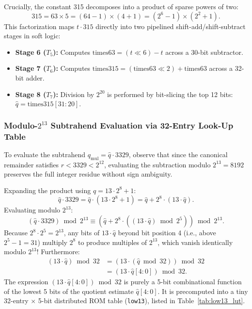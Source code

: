 Crucially, the constant 315 decomposes into a product of sparse powers of two:
\begin{equation}
\label{eq:factor_315_math}
315 = 63 \times 5 = (64 - 1) \times (4 + 1) = \left(2^6 - 1\right) \times \left(2^2 + 1\right).
\end{equation}
This factorization maps $t \cdot 315$ directly into two pipelined shift-add/shift-subtract stages in soft logic:
\begin{itemize}
    \item \textbf{Stage 6 ($T_5$):} Computes $\text{times63} = (t \ll 6) - t$ across a 30-bit subtractor.
    \item \textbf{Stage 7 ($T_6$):} Computes $\text{times315} = (\text{times63} \ll 2) + \text{times63}$ across a 32-bit adder.
    \item \textbf{Stage 8 ($T_7$):} Division by $2^{20}$ is performed by bit-slicing the top 12 bits: $\hat{q} = \text{times315}[31:20]$.
\end{itemize}

\subsubsection{Modulo-\texorpdfstring{$2^{13}$}{2\textasciicircum 13} Subtrahend Evaluation via 32-Entry Look-Up Table}
To evaluate the subtrahend $q_{\text{mul}} = \hat{q} \cdot 3329$, observe that since the canonical remainder satisfies $r < 3329 < 2^{12}$, evaluating the subtraction modulo $2^{13} = 8192$ preserves the full integer residue without sign ambiguity.

Expanding the product using $q = 13 \cdot 2^8 + 1$:
\begin{equation}
\label{eq:qmul_expansion}
\hat{q} \cdot 3329 = \hat{q} \cdot \left(13 \cdot 2^8 + 1\right) = \hat{q} + 2^8 \cdot \left(13 \cdot \hat{q}\right).
\end{equation}
Evaluating modulo $2^{13}$:
\begin{equation}
\label{eq:qmul_mod_213}
\left(\hat{q} \cdot 3329\right) \bmod 2^{13} \equiv \left(\hat{q} + 2^8 \cdot \left((13 \cdot \hat{q}) \bmod 2^5\right)\right) \bmod 2^{13}.
\end{equation}
Because $2^8 \cdot 2^5 = 2^{13}$, any bits of $13 \cdot \hat{q}$ beyond bit position 4 (i.e., above $2^5 - 1 = 31$) multiply $2^8$ to produce multiples of $2^{13}$, which vanish identically modulo $2^{13}$! Furthermore:
\begin{equation}
\label{eq:lut_equivalence}
\begin{aligned}
(13 \cdot \hat{q}) \bmod 32 &= \left(13 \cdot (\hat{q} \bmod 32)\right) \bmod 32 \\
&= \left(13 \cdot \hat{q}[4:0]\right) \bmod 32.
\end{aligned}
\end{equation}
The expression $(13 \cdot \hat{q}[4:0]) \bmod 32$ is purely a 5-bit combinational function of the lowest 5 bits of the quotient estimate $\hat{q}[4:0]$. It is precomputed into a tiny 32-entry $\times$ 5-bit distributed ROM table (\texttt{low13}), listed in Table~\ref{tab:low13_lut}.

